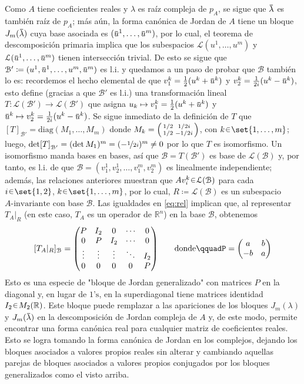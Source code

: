 \begin{sol}
\begin{enumerate}[leftmargin=*, label=(\alph*)]
{    Como $A$ tiene coeficientes reales y $\lambda$ es raíz compleja de $p_A$, se sigue que $\ubar{\lambda}$ es también raíz de $p_A$; más aún, la forma canónica de Jordan de $A$ tiene un bloque $J_m(\ubar{\lambda})$ cuya base asociada es $(\ubar{u}^1,\dots,\ubar{u}^m)$, por lo cual, el teorema de descomposición primaria implica que los subespacios $\mathcal{L}(u^1,\dots,u^m)$ y $\mathcal{L}(\ubar{u}^1,\dots,\ubar{u}^m)$ tienen intersección trivial. De esto se sigue que $\mathcal{B}' \coloneq (u^1,\ubar{u}^1,\dots,u^m,\ubar{u}^m)$ es l.i. y quedamos a un paso de probar que $\mathcal{B}$ también lo es: recordemos el hecho elemental de que $v^k_1 = \frac12(u^k + \ubar{u}^k)$ y $v^k_2 = \frac{1}{2i}(u^k - \ubar{u}^k)$, esto define (gracias a que $\mathcal{B}'$ es l.i.) una transformación lineal $T \colon \mathcal{L}(\mathcal{B}') \to \mathcal{L}(\mathcal{B}')$ que asigna $u_k \mapsto v^k_1 = \frac12(u^k + \ubar{u}^k)$ y $\ubar{u}^k \mapsto v^k_2 = \frac{1}{2i}(u^k - \ubar{u}^k)$. Se sigue inmediato de la definición de $T$ que $[T]_{\mathcal{B}'} = \mathrm{diag}(M_1,\dots,M_m)$ donde $M_k = \smqty(1/2&1/2i\\1/2&-1/2i)$, con $k \en \set{1,\dots,m}$; luego, $\det[T]_{\mathcal{B}'} = (\det M_1)^m = (-\nicefrac{1}{2i})^m \neq 0$ por lo que $T$ es isomorfismo. Un isomorfismo manda bases en bases, así que $\mathcal{B} = T(\mathcal{B}')$ es base de $\mathcal{L}(\mathcal{B})$ y, por tanto, es l.i.
} %
de que $\mathcal{B} = (v^1_1,v^1_2,\dots,v^m_1,v^m_2)$ es linealmente independiente; además, las relaciones anteriores muestran que $Av^k_i \en \mathcal{L}(\mathcal{B})$ para cada $i\en\set{1,2}$, $k\en\set{1,\dots,m}$, por lo cual, $R \coloneq \mathcal{L}(\mathcal{B})$ es un subespacio $A\text{-invariante}$ con base $\mathcal{B}$. Las igualdades en \eqref{eq:rel} implican que, al representar $T_A|_R$ (en este caso, $T_A$ es un operador de $\mathbb{R}^n$) en la base $\mathcal{B}$, obtenemos
\[
[T_A|_R]_\mathcal{B}%
= \mqty(%
P & I_2 & 0 & \cdots & 0 \\
0 & P & I_2 & \cdots & 0 \\
\vdots & \vdots & \vdots & \ddots & I_2 \\
0 & 0 & 0 & 0 & P
)%
\qquad\text{donde}\qquad%
P = \mqty(a&b\\-b&a)
\]
Esto es una especie de "bloque de Jordan generalizado" con matrices $P$ en la diagonal y, en lugar de $1\text{'s}$, en la superdiagonal tiene matrices identidad $I_2 \en M_2(\mathbb{R})$. Este bloque puede remplazar a las apariciones de los bloques $J_m(\lambda)$ y $J_m(\ubar{\lambda})$ en la descomposición de Jordan compleja de $A$ y, de este modo, permite encontrar una forma canónica real para cualquier matriz de coeficientes reales. Esto se logra tomando la forma canónica de Jordan en los complejos, dejando los bloques asociados a valores propios reales sin alterar y cambiando aquellas parejas de bloques asociados a valores propios conjugados por los bloques generalizados como el visto arriba.\par\vspace{1em}

\end{enumerate}
\end{sol}
